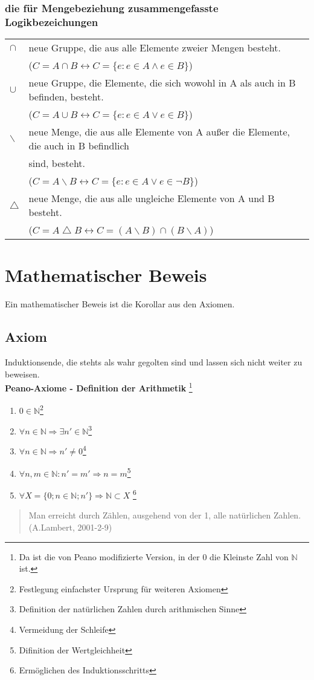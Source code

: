 \documentclass{article}
\begin{document}
    \subsubsection{die für Mengebeziehung zusammengefasste Logikbezeichungen}
    \begin{tabular}{ll}
        $\cap$ &neue Gruppe, die aus alle Elemente zweier Mengen besteht.\\&($C=A\cap B\leftrightarrow C=\{e:e\in A\wedge e\in B\} $)\\
        $\cup$ &neue Gruppe, die Elemente, die sich wowohl in A als auch in B befinden, besteht.\\&($C=A\cup B\leftrightarrow C=\{e:e\in A\vee e\in B\} $)\\
        $\backslash$ &neue Menge, die aus alle Elemente von A außer die Elemente, die auch in B befindlich\\& sind, besteht.\\&($C=A\backslash B\leftrightarrow C=\{e:e\in A\vee e\in \lnot B\} $)\\
        $\bigtriangleup $ &neue Menge, die aus alle ungleiche Elemente von A und B besteht.\\&($C=A\bigtriangleup B\leftrightarrow C=(A\backslash B)\cap (B\backslash A)  $)\\
    \end{tabular}
    
    \section{Mathematischer Beweis}
    Ein mathematischer Beweis ist die Korollar aus den Axiomen.
    \subsection{Axiom}
    Induktionsende, die stehts als wahr gegolten sind und lassen sich nicht weiter zu beweisen.\\
    \textbf{Peano-Axiome - Definition der Arithmetik}
    \footnote{Da ist die von Peano modifizierte Version, in der 0 die Kleinste Zahl von $\mathbb{N}$ ist.}
    \begin{enumerate}
        \item $0\in \mathbb{N}$\footnote{Festlegung einfachster Ursprung für weiteren Axiomen}
        \item $\forall n \in \mathbb{N} \Rightarrow \exists n' \in \mathbb{N}$\footnote{Definition der natürlichen Zahlen durch arithmischen Sinne}
        \item $\forall n \in \mathbb{N} \Rightarrow n' \neq 0 $\footnote{Vermeidung der Schleife}
        \item $\forall n,m \in \mathbb{N} :n'=m'\Rightarrow n=m$\footnote{Difinition der Wertgleichheit}
        \item $\forall X=\{0; n\in \mathbb{N}; n'\} \Rightarrow \mathbb{N} \subset X$ \footnote{Ermöglichen des Induktionsschritts}
    \end{enumerate}
    \begin{quotation}
        Man erreicht durch Zählen, ausgehend von der 1, alle natürlichen Zahlen.
        (A.Lambert, 2001-2-9)
    \end{quotation}
\end{document}
